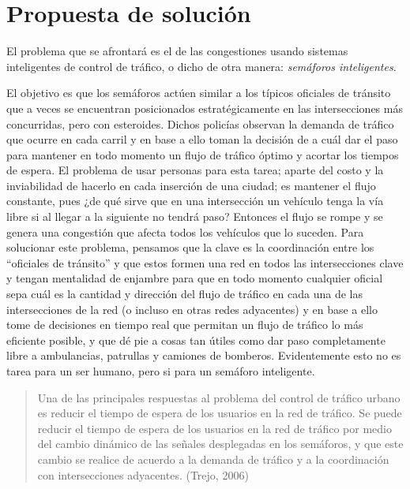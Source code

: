 \hypertarget{propuesta-de-soluciuxf3n}{%
\section{Propuesta de solución}\label{propuesta-de-soluciuxf3n}}

El problema que se afrontará es el de las congestiones usando sistemas
inteligentes de control de tráfico, o dicho de otra manera:
\emph{semáforos inteligentes}.

El objetivo es que los semáforos actúen similar a los típicos oficiales
de tránsito que a veces se encuentran posicionados estratégicamente en
las intersecciones más concurridas, pero con esteroides. Dichos policías
observan la demanda de tráfico que ocurre en cada carril y en base a
ello toman la decisión de a cuál dar el paso para mantener en todo
momento un flujo de tráfico óptimo y acortar los tiempos de espera. El
problema de usar personas para esta tarea; aparte del costo y la
inviabilidad de hacerlo en cada inserción de una ciudad; es mantener el
flujo constante, pues ¿de qué sirve que en una intersección un vehículo
tenga la vía libre si al llegar a la siguiente no tendrá paso? Entonces
el flujo se rompe y se genera una congestión que afecta todos los
vehículos que lo suceden. Para solucionar este problema, pensamos que la
clave es la coordinación entre los ``oficiales de tránsito'' y que estos
formen una red en todos las intersecciones clave y tengan mentalidad de
enjambre para que en todo momento cualquier oficial sepa cuál es la
cantidad y dirección del flujo de tráfico en cada una de las
intersecciones de la red (o incluso en otras redes adyacentes) y en base
a ello tome de decisiones en tiempo real que permitan un flujo de
tráfico lo más eficiente posible, y que dé pie a cosas tan útiles como
dar paso completamente libre a ambulancias, patrullas y camiones de
bomberos. Evidentemente esto no es tarea para un ser humano, pero si
para un semáforo inteligente.

\begin{quote}
Una de las principales respuestas al problema del control de tráfico
urbano es reducir el tiempo de espera de los usuarios en la red de
tráfico. Se puede reducir el tiempo de espera de los usuarios en la red
de tráfico por medio del cambio dinámico de las señales desplegadas en
los semáforos, y que este cambio se realice de acuerdo a la demanda de
tráfico y a la coordinación con intersecciones adyacentes. (Trejo, 2006)
\end{quote}

